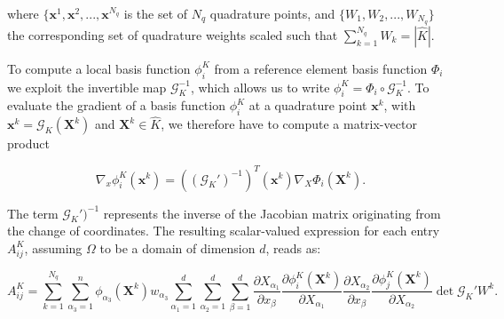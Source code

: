 where $\lbrace \boldsymbol{x}^1, \boldsymbol{x}^2, ..., \boldsymbol{x}^{N_q}$ is the set of $N_q$ quadrature points, and $\lbrace W_1, W_2, ..., W_{N_q} \rbrace$ the corresponding set of quadrature weights scaled such that $\sum_{k=1}^{N_q} W_k = |\hat{K}|$. 

To compute a local basis function $\phi_i^K$ from a reference element basis function $\Phi_i$ we exploit the invertible map $\mathcal{G}_K^{-1}$, which allows us to write $\phi_i^K = \Phi_i \circ \mathcal{G}_K^{-1}$. To evaluate the gradient of a basis function $\phi_i^K$ at a quadrature point $\boldsymbol{x}^k$, with $\boldsymbol{x}^k = \mathcal{G}_K(\boldsymbol{X}^k)$ and $\boldsymbol{X}^k \in \hat{K}$, we therefore have to compute a matrix-vector product

\begin{equation}
\nabla_x \phi_i^K(\boldsymbol{x}^k) = ((\mathcal{G}_K')^{-1})^{T}(\boldsymbol{x}^k) \nabla_X \Phi_i(\boldsymbol{X}^k).
\end{equation}

The term $\mathcal{G}_K')^{-1}$ represents the inverse of the Jacobian matrix originating from the change of coordinates. The resulting scalar-valued expression for each entry $A_{ij}^K$, assuming $\Omega$ to be a domain of dimension $d$, reads as:

\begin{equation}
\label{eq:quadrature}
A_{ij}^K = \sum_{k=1}^{N_q} \sum_{\alpha_3=1}^n \phi_{\alpha_3}(\boldsymbol{X}^k) w_{\alpha_3} \sum_{\alpha_1=1}^d \sum_{\alpha_2=1}^d \sum_{\beta=1}^d \frac{\partial X_{\alpha_1}}{\partial x_{\beta}} \frac{\partial \phi_i^K(\boldsymbol{X}^k)}{\partial X_{\alpha_1}} \frac{\partial X_{\alpha_2}}{\partial x_{\beta}} \frac{\partial \phi_j^K(\boldsymbol{X}^k)}{\partial X_{\alpha_2}} \operatorname{det} \mathcal{G}_K' W^k.
\end{equation}


